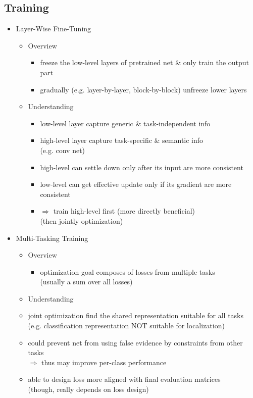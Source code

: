 \subsection{Training}
\begin{itemize}
\item Layer-Wise Fine-Tuning
	\begin{itemize}
	\item Overview
		\begin{itemize}
		\item freeze the low-level layers of pretrained net \& only train the output part
		\item gradually (e.g. layer-by-layer, block-by-block) unfreeze lower layers
		\end{itemize}
	\item Understanding
		\begin{itemize}
		\item low-level layer capture generic \& task-independent info
		\item high-level layer capture task-specific \& semantic info \\
		(e.g. conv net)
		\item high-level can settle down only after its input are more consistent
		\item low-level can get effective update only if its gradient are more consistent
		\item $\Rightarrow$ train high-level first (more directly beneficial) \\
		(then jointly optimization)
		\end{itemize}
	\end{itemize}
	
\item Multi-Tasking Training
	\begin{itemize}
	\item Overview
		\begin{itemize}
		\item optimization goal composes of losses from multiple tasks \\
		(usually a sum over all losses)
		\end{itemize}
	\item Understanding
		\item joint optimization find the shared representation suitable for all tasks \\
		(e.g. classification representation NOT suitable for localization)
		\item could prevent net from using false evidence by constraints from other tasks \\
		$\Rightarrow$ thus may improve per-class performance
		\item able to design loss more aligned with final evaluation matrices \\
		(though, really depends on loss design)
	\end{itemize}
\end{itemize}


